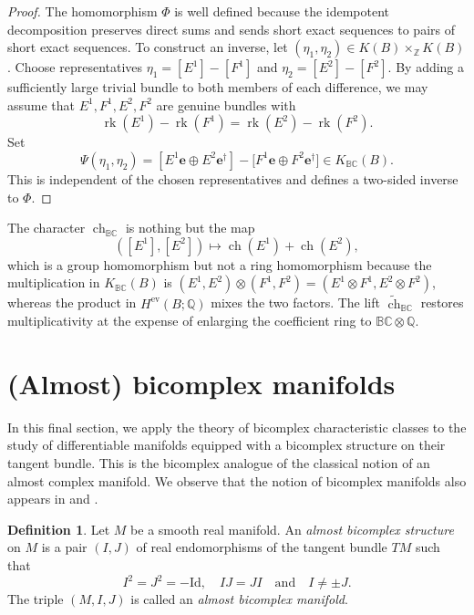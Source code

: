 \documentclass[11pt]{amsart}
\newcommand{\BC}{\mathbb{BC}}       %
\theoremstyle{definition}
\newtheorem{defn}[prop]{Definition}       %
\begin{document}
\begin{proof}
The homomorphism $\Phi$ is well defined because the idempotent decomposition preserves direct sums and sends short exact sequences to pairs of short exact sequences. To construct an inverse, let $(\eta_{1},\eta_{2})\in K(B)\times_{\mathbb{Z}}K(B)$. Choose representatives $\eta_{1}=[E^{1}]-[F^{1}]$ and $\eta_{2}=[E^{2}]-[F^{2}]$. By adding a sufficiently large trivial bundle to both members of each difference, we may assume that $E^{1},F^{1},E^{2},F^{2}$ are genuine bundles with
\begin{equation*}
\operatorname{rk}(E^{1})-\operatorname{rk}(F^{1})=\operatorname{rk}(E^{2})-\operatorname{rk}(F^{2}).
\end{equation*}
Set
\begin{equation*}
\Psi(\eta_{1},\eta_{2})
=[E^{1}\mathbf{e}\oplus E^{2}\mathbf{e}^{\dagger}]
-\bigl[F^{1}\mathbf{e}\oplus F^{2}\mathbf{e}^{\dagger}]
\in K_{\mathbb{B}\mathbb{C}}(B).
\end{equation*}
This is independent of the chosen representatives and defines a two-sided inverse to $\Phi$.
\end{proof}

The character $\operatorname{ch}_{\BC}$ is nothing but the map
\begin{equation*}
([E^{1}],[E^{2}])\mapsto\operatorname{ch}(E^{1})+\operatorname{ch}(E^{2}),
\end{equation*}
which is a group homomorphism but not a ring homomorphism because the multiplication in $K_{\BC}(B)$ is $(E^{1},E^{2})\otimes(F^{1},F^{2})=(E^{1}\otimes F^{1},E^{2}\otimes F^{2})$, whereas the product in $H^{\mathrm{ev}}(B;\mathbb Q)$ mixes the two factors.  The lift $\widetilde{\operatorname{ch}}_{\BC}$ restores multiplicativity at the expense of enlarging the coefficient ring to $\BC\otimes\mathbb Q$.

\section{(Almost) bicomplex manifolds}

In this final section, we apply the theory of bicomplex characteristic classes to the study of differentiable manifolds equipped with a bicomplex structure on their tangent bundle. This is the bicomplex analogue of the classical notion of an almost complex manifold. We observe that the notion of bicomplex manifolds also appears in \cite{BairdWood} and \cite{SalimovCakan}. 

\begin{defn}\label{def:almost_bicomplex}
Let $M$ be a smooth real manifold. An \emph{almost bicomplex structure} on $M$ is a pair $(I,J)$ of real endomorphisms of the tangent bundle $TM$ such that
\begin{equation*}
I^{2}=J^{2}=-\mathrm{Id},\quad IJ=JI\quad \text{and}\quad I\neq\pm J.
\end{equation*}
The triple $(M,I,J)$ is called an \emph{almost bicomplex manifold}.
\end{defn}
\end{document}
